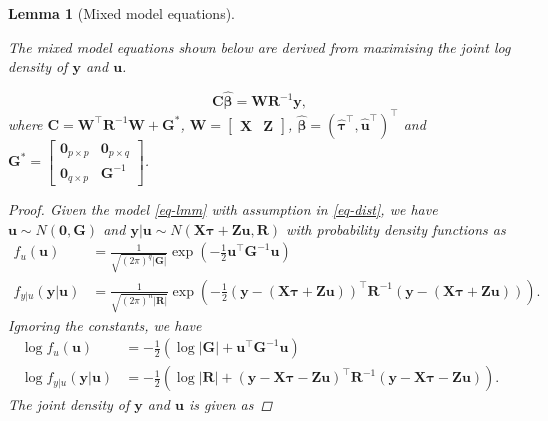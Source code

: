 \documentclass[
  a4paper,
  oneside,
  openany,
  12pt,
  onecolumn]{book}
\theoremstyle{definition}
\theoremstyle{definition}
\theoremstyle{plain}
\newtheorem{lemma}{Lemma}[chapter]
\theoremstyle{remark}
\begin{document}
\begin{lemma}[Mixed model
equations]\protect\hypertarget{lem-mme}{}\label{lem-mme}

The mixed model equations shown below are derived from maximising the
joint log density of \(\boldsymbol{y}\) and \(\boldsymbol{u}\).

\[\boldsymbol{C}\hat{\boldsymbol{\beta}} = \boldsymbol{W}\boldsymbol{R}^{-1}\boldsymbol{y},\]
where
\(\boldsymbol{C} = \boldsymbol{W}^\top\boldsymbol{R}^{-1}\boldsymbol{W} + \boldsymbol{G}^*\),
\(\boldsymbol{W} = \begin{bmatrix}\boldsymbol{X} & \boldsymbol{Z} \end{bmatrix}\),
\(\hat{\boldsymbol{\beta}} = (\hat{\boldsymbol{\tau}}^\top, \hat{\boldsymbol{u}}^\top)^\top\)
and
\(\boldsymbol{G}^* = \begin{bmatrix}\boldsymbol{0}_{p\times p} & \boldsymbol{0}_{p\times q} \\ \boldsymbol{0}_{q\times p} & \boldsymbol{G}^{-1}\end{bmatrix}\).

\begin{proof}
Given the model \ref{eq-lmm} with assumption in \ref{eq-dist}, we have
\(\boldsymbol{u}\sim N(\boldsymbol{0},\boldsymbol{G})\) and
\(\boldsymbol{y}|\boldsymbol{u}\sim N(\boldsymbol{X}\boldsymbol{\tau}+\boldsymbol{Z}\boldsymbol{u},\boldsymbol{R})\)
with probability density functions as
\[\begin{aligned}f_u(\boldsymbol{u}) &= \frac{1}{\sqrt{(2\pi)^{q}|\boldsymbol{G}|}}\exp\left(-\frac{1}{2}\boldsymbol{u}^\top\boldsymbol{G}^{-1}\boldsymbol{u}\right)\\
f_{y|u}(\boldsymbol{y}|\boldsymbol{u}) &= \frac{1}{\sqrt{(2\pi)^{n}|\boldsymbol{R}|}}\exp\left(-\frac{1}{2}(\boldsymbol{y}-(\boldsymbol{X}\boldsymbol{\tau}+\boldsymbol{Z}\boldsymbol{u}))^\top\boldsymbol{R}^{-1}(\boldsymbol{y}-(\boldsymbol{X}\boldsymbol{\tau}+\boldsymbol{Z}\boldsymbol{u}))\right).
\end{aligned}\] Ignoring the constants, we have \[\begin{aligned}
\log f_u(\boldsymbol{u}) &= -\frac{1}{2}\left(\log |\boldsymbol{G}|+\boldsymbol{u}^\top\boldsymbol{G}^{-1}\boldsymbol{u}\right)\\
\log f_{y|u}(\boldsymbol{y}|\boldsymbol{u}) &=-\frac{1}{2}\left(\log |\boldsymbol{R}|+(\boldsymbol{y}-\boldsymbol{X}\boldsymbol{\tau}-\boldsymbol{Z}\boldsymbol{u})^\top\boldsymbol{R}^{-1}(\boldsymbol{y}-\boldsymbol{X}\boldsymbol{\tau}-\boldsymbol{Z}\boldsymbol{u})\right).
\end{aligned}\] The joint density of \(\boldsymbol{y}\) and
\(\boldsymbol{u}\) is given as


\end{proof}
\end{lemma}
\end{document}
